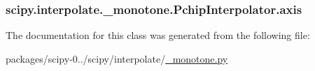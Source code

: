 \subsubsection[{axis}]{\setlength{\rightskip}{0pt plus 5cm}scipy.\+interpolate.\+\_\+monotone.\+Pchip\+Interpolator.\+axis}\label{classscipy_1_1interpolate_1_1__monotone_1_1PchipInterpolator_af730ab388cf28121cdb63abe9d6d90f2}


The documentation for this class was generated from the following file\+:\begin{DoxyCompactItemize}
\item 
packages/scipy-\/0../scipy/interpolate/\hyperlink{__monotone_8py}{\+\_\+monotone.\+py}\end{DoxyCompactItemize}
